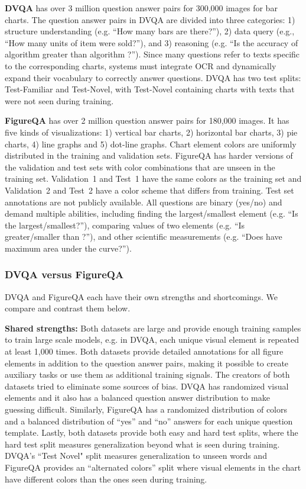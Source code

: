 \documentclass[10pt,twocolumn]{article}
\begin{document}
\textbf{DVQA} has over 3 million question answer pairs for 300,000 images for bar charts. The question answer pairs in DVQA are divided into three categories: 1) structure understanding (e.g. ``How many bars are there?''), 2) data query (e.g., ``How many units of item  were sold?''), and 3) reasoning (e.g. ``Is the accuracy of algorithm  greater than algorithm ?''). Since many questions refer to texts specific to the corresponding charts, systems must integrate OCR and dynamically expand their vocabulary to correctly answer questions. DVQA has two test splits: Test-Familiar and Test-Novel, with Test-Novel containing charts with texts that were not seen during training.

\textbf{FigureQA} has over 2 million question answer pairs for 180,000 images. It has five kinds of visualizations: 1) vertical bar charts, 2) horizontal bar charts, 3) pie charts, 4) line graphs and 5) dot-line graphs. Chart element colors are uniformly distributed in the training and validation sets. FigureQA has harder versions of the validation and test sets with color combinations that are unseen in the training set. Validation~1 and Test~1 have the same colors as the training set and Validation~2 and Test~2 have a color scheme that differs from training. Test set annotations are not publicly available. All questions are binary (yes/no) and demand multiple abilities, including finding the largest/smallest element (e.g. ``Is  the largest/smallest?''), comparing values of two elements (e.g. ``Is  greater/smaller than ?''), and other scientific measurements (e.g. ``Does  have maximum area under the curve?''). 

\subsubsection{DVQA versus FigureQA}
DVQA and FigureQA each have their own strengths and shortcomings. We compare and contrast them below.

\textbf{Shared strengths:} Both datasets are large and provide enough training samples to train large scale models, e.g. in DVQA, each unique visual element is repeated at least 1,000 times. Both datasets provide detailed annotations for all figure elements in addition to the question answer pairs, making it possible to create auxiliary tasks or use them as additional training signals. The creators of both datasets tried to eliminate some sources of bias. DVQA has randomized visual elements and it also has a balanced question answer distribution to make guessing difficult. Similarly, FigureQA has a randomized distribution of colors and a balanced distribution of ``yes'' and ``no'' answers for each unique question template. Lastly, both datasets provide both easy and hard test splits, where the hard test split measures generalization beyond what is seen during training. DVQA's ``Test Novel" split measures generalization to unseen words and FigureQA provides an ``alternated colors'' split where visual elements in the chart have different colors than the ones seen during training.
    
\end{document}
